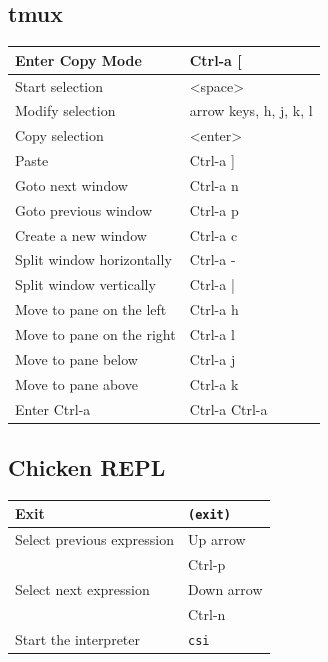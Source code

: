 \documentclass[10pt,a4paper,landscape,english,twoside]{article}
\begin{document}
\begin{multicols}{2}
\subsection*{tmux}
{
\setlength{\extrarowheight}{1.5pt}
\begin{tabular}[t]{|l|l|}
\hline
Enter Copy Mode & Ctrl-a [ \\ \hline
\hspace{0.5cm} Start selection & <space> \\ \hline
\hspace{0.5cm} Modify selection & arrow keys, h, j, k, l \\ \hline
\hspace{0.5cm} Copy selection & <enter> \\ \hline
Paste & Ctrl-a ] \\ \hline
Goto next window & Ctrl-a n \\ \hline
Goto previous window & Ctrl-a p \\ \hline
Create a new window & Ctrl-a c \\ \hline
Split window horizontally & Ctrl-a - \\ \hline
Split window vertically & Ctrl-a | \\ \hline
Move to pane on the left & Ctrl-a h \\ \hline
Move to pane on the right & Ctrl-a l \\ \hline
Move to pane below & Ctrl-a j \\ \hline
Move to pane above & Ctrl-a k \\ \hline
Enter Ctrl-a & Ctrl-a Ctrl-a \\ \hline
\end{tabular}
}
\subsection*{Chicken REPL}
{
\setlength{\extrarowheight}{1.5pt}
\begin{tabular}[t]{|l|l|}
\hline
Exit & \texttt{(exit)} \\ \hline
Select previous expression & Up arrow \\
& Ctrl-p \\ \hline
Select next expression & Down arrow \\ 
& Ctrl-n \\ \hline
Start the interpreter & \texttt{csi} \\ \hline
\end{tabular}
}


\end{multicols}
\end{document}
